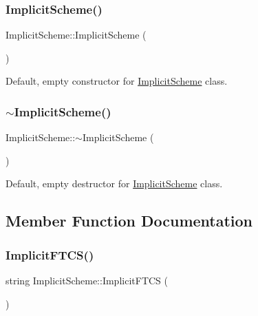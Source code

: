 \subsubsection{\texorpdfstring{Implicit\+Scheme()}{ImplicitScheme()}}
{\footnotesize\ttfamily Implicit\+Scheme\+::\+Implicit\+Scheme (\begin{DoxyParamCaption}{ }\end{DoxyParamCaption})}

Default, empty constructor for \mbox{\hyperlink{class_implicit_scheme}{Implicit\+Scheme}} class. \mbox{\label{class_implicit_scheme_aca61347d2335e248678f7f3060785762}} 
\subsubsection{\texorpdfstring{$\sim$\+Implicit\+Scheme()}{~ImplicitScheme()}}
{\footnotesize\ttfamily Implicit\+Scheme\+::$\sim$\+Implicit\+Scheme (\begin{DoxyParamCaption}{ }\end{DoxyParamCaption})}

Default, empty destructor for \mbox{\hyperlink{class_implicit_scheme}{Implicit\+Scheme}} class. 

\subsection{Member Function Documentation}
\mbox{\label{class_implicit_scheme_afd2b8e73e914a04c326b8cba0d5810ce}} 
\subsubsection{\texorpdfstring{Implicit\+F\+T\+C\+S()}{ImplicitFTCS()}}
{\footnotesize\ttfamily string Implicit\+Scheme\+::\+Implicit\+F\+T\+CS (\begin{DoxyParamCaption}{ }\end{DoxyParamCaption})}

